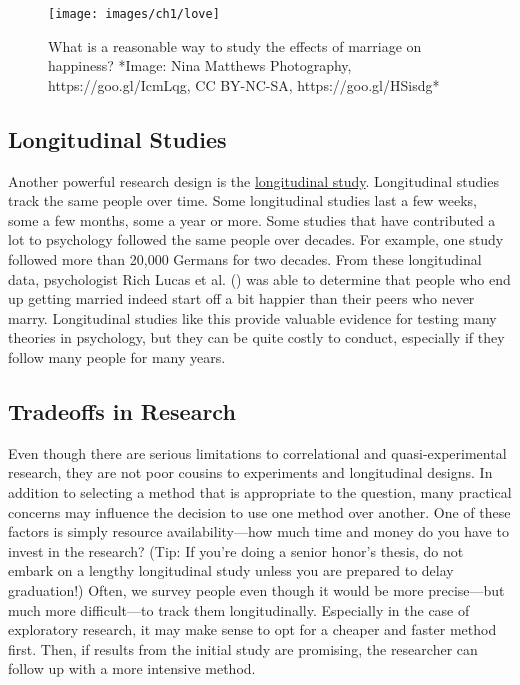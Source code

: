 \documentclass[
]{krantz}
\begin{document}
\begin{figure}

{\centering \texttt{[image: images/ch1/love]} 

}

\caption{What is a reasonable way to study the effects of marriage on happiness? *Image: Nina Matthews Photography, https://goo.gl/IcmLqg, CC BY-NC-SA, https://goo.gl/HSisdg*}\label{fig:love}
\end{figure}

\subsection*{Longitudinal Studies}\label{longitudinal-studies}


Another powerful research design is the \hyperref[longitudinal-study]{longitudinal study}. Longitudinal studies track the same people over time. Some longitudinal studies last a few weeks, some a few months, some a year or more. Some studies that have contributed a lot to psychology followed the same people over decades. For example, one study followed more than 20,000 Germans for two decades. From these longitudinal data, psychologist Rich Lucas et al. () was able to determine that people who end up getting married indeed start off a bit happier than their peers who never marry. Longitudinal studies like this provide valuable evidence for testing many theories in psychology, but they can be quite costly to conduct, especially if they follow many people for many years.

\subsection*{Tradeoffs in Research}\label{tradeoffs-in-research}


Even though there are serious limitations to correlational and quasi-experimental research, they are not poor cousins to experiments and longitudinal designs. In addition to selecting a method that is appropriate to the question, many practical concerns may influence the decision to use one method over another. One of these factors is simply resource availability---how much time and money do you have to invest in the research? (Tip: If you're doing a senior honor's thesis, do not embark on a lengthy longitudinal study unless you are prepared to delay graduation!) Often, we survey people even though it would be more precise---but much more difficult---to track them longitudinally. Especially in the case of exploratory research, it may make sense to opt for a cheaper and faster method first. Then, if results from the initial study are promising, the researcher can follow up with a more intensive method.
\end{document}
